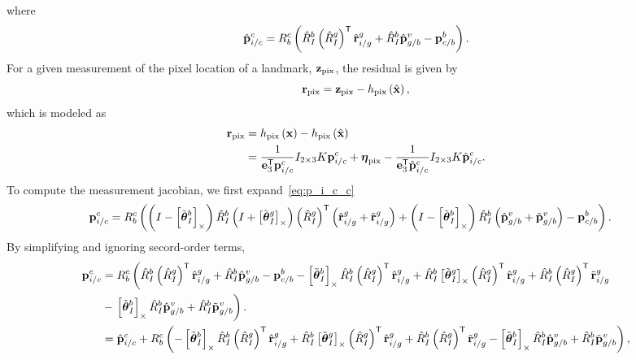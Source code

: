 where
\begin{align}
  \hat{\boldsymbol{\mathrm{p}}}_{i/c}^c = R_b^c \left( \hat{R}_I^b \left( \hat{R}_I^g \right)^{\mathsf{T}}
  \hat{\boldsymbol{\mathrm{r}}}_{i/g}^g + \hat{R}_I^b \hat{\boldsymbol{\mathrm{p}}}_{g/b}^v - \boldsymbol{\mathrm{p}}_{c/b}^b
\right).
\end{align}
For a given measurement of the pixel location of a landmark,
$\boldsymbol{\mathrm{z}}_{\text{pix}}$, the residual is given by
\begin{equation}
  \boldsymbol{\mathrm{r}}_{\text{pix}} = \boldsymbol{\mathrm{z}}_{\text{pix}} - h_{\text{pix}} \left( \hat{\boldsymbol{\mathrm{x}}}
    \right),
\end{equation}
which is modeled as
\begin{align}
  \boldsymbol{\mathrm{r}}_{\text{pix}} &= h_{\text{pix}} \left( \boldsymbol{\mathrm{x}} \right) - h_{\text{pix}} \left( \hat{\boldsymbol{\mathrm{x}}}
    \right) \\
  &= \frac{1}{\boldsymbol{\mathrm{e}}_3^{\mathsf{T}} \boldsymbol{\mathrm{p}}_{i/c}^c} I_{2 \times 3} K
  \boldsymbol{\mathrm{p}}_{i/c}^c + \boldsymbol{\mathrm{\eta}}_{\text{pix}} - \frac{1}{\boldsymbol{\mathrm{e}}_3^{\mathsf{T}} \hat{\boldsymbol{\mathrm{p}}}_{i/c}^c} I_{2 \times 3} K
  \hat{\boldsymbol{\mathrm{p}}}_{i/c}^c.
\end{align}
To compute the measurement jacobian, we first expand~\eqref{eq:p_i_c_c}
\begin{align}
  \boldsymbol{\mathrm{p}}_{i/c}^c &= R_b^c \left( \left( I - \left[ \tilde{\boldsymbol{\mathrm{\theta}}}_I^b
     \right]_{\times} \right) \hat{R}_I^b \left( I + \left[ \tilde{\boldsymbol{\mathrm{\theta}}}_I^g  \right]_{\times}
  \right) \left( \hat{R}_I^g \right)^{\mathsf{T}}
\left( \hat{\boldsymbol{\mathrm{r}}}_{i/g}^g  + \tilde{\boldsymbol{\mathrm{r}}}_{i/g}^g \right) + \left( I - \left[ \tilde{\boldsymbol{\mathrm{\theta}}}_I^b
 \right]_{\times} \right) \hat{R}_I^b \left( \hat{\boldsymbol{\mathrm{p}}}_{g/b}^v + \tilde{\boldsymbol{\mathrm{p}}}_{g/b}^v \right) - \boldsymbol{\mathrm{p}}_{c/b}^b \right).
\end{align}
By simplifying and ignoring secord-order terms,
\begin{align*}
  \boldsymbol{\mathrm{p}}_{i/c}^c &= R_b^c \left( \hat{R}_I^b \left( \hat{R}_I^g \right)^{\mathsf{T}}
  \hat{\boldsymbol{\mathrm{r}}}_{i/g}^g + \hat{R}_I^b \hat{\boldsymbol{\mathrm{p}}}_{g/b}^v - \boldsymbol{\mathrm{p}}_{c/b}^b
  - \left[ \tilde{\boldsymbol{\mathrm{\theta}}}_I^b \right]_{\times} \hat{R}_I^b \left( \hat{R}_I^g
    \right)^{\mathsf{T}} \hat{\boldsymbol{\mathrm{r}}}_{i/g}^g + \hat{R}_I^b
    \left[ \tilde{\boldsymbol{\mathrm{\theta}}}_I^g \right]_{\times} \left( \hat{R}_I^g
  \right)^{\mathsf{T}} \hat{\boldsymbol{\mathrm{r}}}_{i/g}^g +
\hat{R}_I^b \left( \hat{R}_I^g
    \right)^{\mathsf{T}} \tilde{\boldsymbol{\mathrm{r}}}_{i/g}^g \right. \\
                   &- \left. \left[ \tilde{\boldsymbol{\mathrm{\theta}}}_I^b \right]_{\times} \hat{R}_I^b \hat{\boldsymbol{\mathrm{p}}}_{g/b}^v
    + \hat{R}_I^b \tilde{\boldsymbol{\mathrm{p}}}_{g/b}^v
   \right). \\
    &= \hat{\boldsymbol{\mathrm{p}}}_{i/c}^c
    + R_b^c \left( 
  - \left[ \tilde{\boldsymbol{\mathrm{\theta}}}_I^b \right]_{\times} \hat{R}_I^b \left( \hat{R}_I^g
    \right)^{\mathsf{T}} \hat{\boldsymbol{\mathrm{r}}}_{i/g}^g + \hat{R}_I^b
    \left[ \tilde{\boldsymbol{\mathrm{\theta}}}_I^g \right]_{\times} \left( \hat{R}_I^g
  \right)^{\mathsf{T}} \hat{\boldsymbol{\mathrm{r}}}_{i/g}^g +
\hat{R}_I^b \left( \hat{R}_I^g
    \right)^{\mathsf{T}} \tilde{\boldsymbol{\mathrm{r}}}_{i/g}^g
                   - \left[ \tilde{\boldsymbol{\mathrm{\theta}}}_I^b \right]_{\times} \hat{R}_I^b \hat{\boldsymbol{\mathrm{p}}}_{g/b}^v
    + \hat{R}_I^b \tilde{\boldsymbol{\mathrm{p}}}_{g/b}^v
   \right), 
\end{align*}
